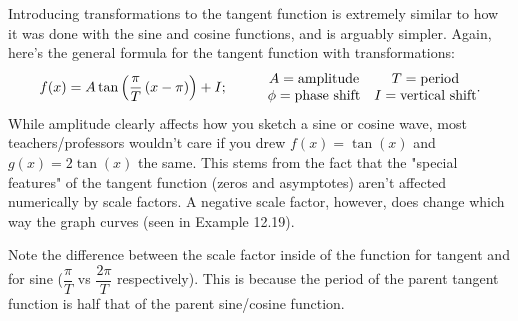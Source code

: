 \documentclass[lang=en,11pt]{elegantbook}
\begin{document}
Introducing transformations to the tangent function is extremely similar to how it was done with the sine and cosine functions, and is arguably simpler. Again, here’s the general formula for the tangent function with transformations: $$f(x)=A\tan\left(\dfrac{\pi}{T}\left(x-\pi\right)\right)+I; \hspace{10mm} \begin{matrix} A=\text{amplitude} & T=\text{period} \\ \phi=\text{phase shift} & I=\text{vertical shift} \end{matrix}.$$
While amplitude clearly affects how you sketch a sine or cosine wave, most teachers/professors wouldn't care if you drew $f(x)=\tan⁡(x)$ and $g(x)=2\tan⁡(x)$ the same. This stems from the fact that the "special features" of the tangent function (zeros and asymptotes) aren't affected numerically by scale factors. A negative scale factor, however, does change which way the graph curves (seen in Example 12.19).

Note the difference between the scale factor inside of the function for tangent and for sine ($\dfrac{\pi}{T}$ vs $\dfrac{2\pi}{T}$ respectively). This is because the period of the parent tangent function is half that of the parent sine/cosine function.
\end{document}
